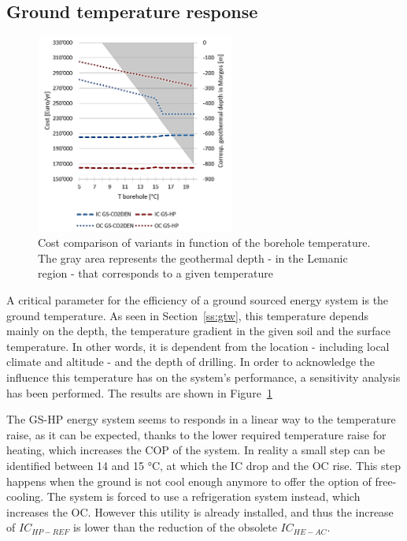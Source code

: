 \documentclass{article}
\begin{document}
\subsection{Ground temperature response}


\begin{figure} 
	\vspace{-20pt}
	\centering
	\includegraphics[width=0.58\textwidth]{V_SA_Tg.png}
	\caption{Cost comparison of variants in function of the borehole temperature. The gray area represents the geothermal depth - in the Lemanic region - that corresponds to a given temperature}
	\label{fig:V_SA_Tg}
	\vspace{-10pt}
\end{figure}

A critical parameter for the efficiency of a ground sourced energy system is the ground temperature. As seen in Section~\ref{ss:gtw}, this temperature depends mainly on the depth, the temperature gradient in the given soil and the surface temperature. In other words, it is dependent from the location - including local climate and altitude - and the depth of drilling. In order to acknowledge the influence this temperature has on the system's performance, a sensitivity analysis has been performed. The results are shown in Figure~\ref{fig:V_SA_Tg}

The GS-HP energy system seems to responds in a linear way to the temperature raise, as it can be expected, thanks to the lower required temperature raise for heating, which increases the COP of the system. In reality a small step can be identified between 14 and 15 \si{\celsius}, at which the IC drop and the OC rise. This step happens when the ground is not cool enough anymore to offer the option of free-cooling. The system is forced to use a refrigeration system instead, which increases the OC. However this utility is already installed, and thus the increase of $IC_{HP-REF}$ is lower than the reduction of the obsolete $IC_{HE-AC}$.
\end{document}
